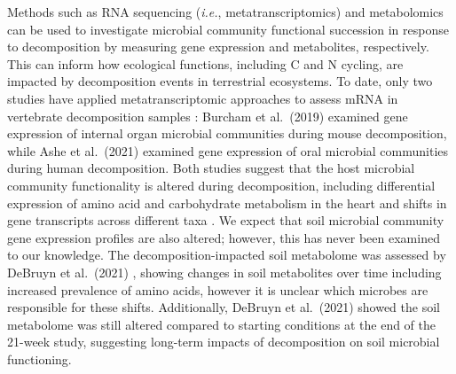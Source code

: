 \documentclass[
  sn-nature,
  lineno, referee]{sn-jnl}
\begin{document}
Methods such as RNA sequencing (\emph{i.e.}, metatranscriptomics) and
metabolomics can be used to investigate microbial community functional
succession in response to decomposition by measuring gene expression and
metabolites, respectively. This can inform how ecological functions,
including C and N cycling, are impacted by decomposition events in
terrestrial ecosystems. To date, only two studies have applied
metatranscriptomic approaches to assess mRNA in vertebrate decomposition
samples \citep{burcham_total_2019, ashe_characterization_2021}: Burcham
et al.~(2019) \citep{burcham_total_2019} examined gene expression of
internal organ microbial communities during mouse decomposition, while
Ashe et al.~(2021) \citep{ashe_characterization_2021} examined gene
expression of oral microbial communities during human decomposition.
Both studies suggest that the host microbial community functionality is
altered during decomposition, including differential expression of amino
acid and carbohydrate metabolism in the heart \citep{burcham_total_2019}
and shifts in gene transcripts across different taxa
\citep{ashe_characterization_2021}. We expect that soil microbial
community gene expression profiles are also altered; however, this has
never been examined to our knowledge. The decomposition-impacted soil
metabolome was assessed by DeBruyn et al.~(2021)
\citep{debruyn_comparative_2021}, showing changes in soil metabolites
over time including increased prevalence of amino acids, however it is
unclear which microbes are responsible for these shifts. Additionally,
DeBruyn et al.~(2021) \citep{debruyn_comparative_2021} showed the soil
metabolome was still altered compared to starting conditions at the end
of the 21-week study, suggesting long-term impacts of decomposition on
soil microbial functioning.
\end{document}
